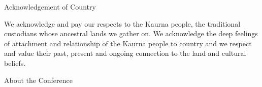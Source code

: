 \documentclass[twoside,14pt,a4paper,notitlepage]{memoir}
\newcounter{chapternonum}
\begin{document}
\pagestyle{plain}



\tableofcontents
\vfill

\pagebreak
\vspace*{2cm}
{\Huge Acknowledgement of Country}
\vspace{2cm}

We acknowledge and pay our respects to the Kaurna people, the traditional custodians whose ancestral lands we gather on. We acknowledge the deep feelings of attachment and relationship of the Kaurna people to country and we respect and value their past, present and ongoing connection to the land and cultural beliefs.
\vfill

\pagebreak
\vspace*{2cm}
{\Huge About the Conference}
\vspace{2cm}

\lipsum[1-2]
\vfill



\cleardoublepage
\end{document}
